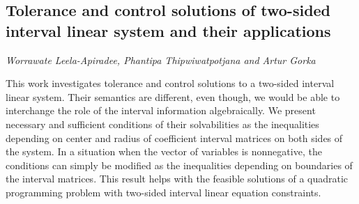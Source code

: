 \documentclass[../booklet.tex]{subfiles}
\begin{document}
\subsection[Tolerance and control solutions of two-sided interval linear system and their applications. {\it Worrawate Leela-Apiradee, Phantipa Thipwiwatpotjana and Artur Gorka}]{Tolerance and control solutions of two-sided interval linear system and their applications}
  

\begin{center}
  {\it Worrawate Leela-Apiradee, Phantipa Thipwiwatpotjana and Artur Gorka}
\end{center}

\vskip 0.8cm


This work investigates tolerance and control solutions to a two-sided interval linear system. Their semantics are different, even though, we would be able to interchange the role of the interval information algebraically. We present   necessary and sufficient conditions of their solvabilities as the inequalities depending on center and radius of coefficient interval matrices on both sides of the system. In a situation when the vector of variables is nonnegative, the conditions can simply be modified as the inequalities depending on boundaries of the interval matrices. This result helps with the feasible solutions of a quadratic programming problem with two-sided interval linear equation constraints. 



\end{document}
